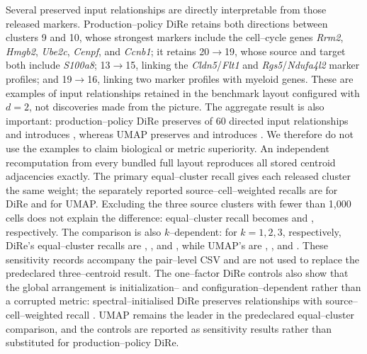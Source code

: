 \documentclass[11pt]{article}
\begin{document}
Several preserved input relationships are directly interpretable from those
released markers. Production--policy DiRe retains both directions between
clusters 9 and 10, whose strongest markers include the cell--cycle genes
\textit{Rrm2}, \textit{Hmgb2}, \textit{Ube2c}, \textit{Cenpf}, and
\textit{Ccnb1}; it retains 20$\rightarrow$19, whose source and target both
include \textit{S100a8}; 13$\rightarrow$15, linking the
\textit{Cldn5}/\textit{Flt1} and \textit{Rgs5}/\textit{Ndufa4l2} marker
profiles; and 19$\rightarrow$16, linking two marker profiles with myeloid
genes. These are examples of input relationships retained in the benchmark
layout configured with $d=2$, not discoveries made from the picture. The aggregate
result is also important: production--policy DiRe preserves
\TenxDireAutoAdjacencyPreserved{} of 60 directed input relationships and
introduces \TenxDireAutoAdjacencyIntroduced{}, whereas UMAP preserves
\TenxCumlUmapAdjacencyPreserved{} and introduces
\TenxCumlUmapAdjacencyIntroduced{}. We therefore do not use the examples to claim biological or
metric superiority. An independent recomputation from every bundled full
layout reproduces all stored centroid adjacencies exactly. The primary
equal--cluster recall gives each released cluster the same weight; the
separately reported source--cell--weighted recalls are
\TenxDireAutoAdjacencyCellWeighted{} for DiRe and
\TenxCumlUmapAdjacencyCellWeighted{} for UMAP. Excluding the three source
clusters with fewer than 1,000 cells does not explain the difference:
equal--cluster recall becomes \TenxDireAutoAdjacencyFilteredEqual{} and
\TenxCumlUmapAdjacencyFilteredEqual{}, respectively. The comparison is also
$k$--dependent: for $k=1,2,3$, respectively, DiRe's equal--cluster recalls are
\TenxDireAutoAdjacencyKOne{}, \TenxDireAutoAdjacencyKTwo{}, and
\TenxDireAutoAdjacencyKThree{}, while UMAP's are
\TenxCumlUmapAdjacencyKOne{}, \TenxCumlUmapAdjacencyKTwo{}, and
\TenxCumlUmapAdjacencyKThree{}. These sensitivity records accompany the
pair--level CSV and are not used to replace the predeclared three--centroid
result. The one--factor DiRe controls also show that the global arrangement is
initialization-- and configuration--dependent rather than a corrupted metric:
spectral--initialised DiRe preserves
\TenxDireSpectralAdjacencyPreserved{} relationships with source--cell--weighted
recall \TenxDireSpectralAdjacencyCellWeighted{}. UMAP remains the leader in the
predeclared equal--cluster comparison, and the controls are reported as
sensitivity results rather than substituted for production--policy DiRe.
\end{document}
